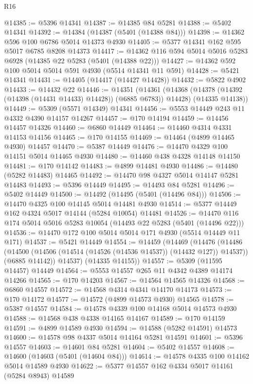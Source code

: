 \begin{lexlean}{R16}
\begin{coremodule}
@14385 := @5396 @14341
@14387 := @14385 @84 @5281
@14388 := @5402 @14341
@14392 := @14384 (@14387 (@5401 (@14388 @84)))
@14398 := @14362 @596 @100 @6786 @5014 @14373 @4930
@14405 := @5377 @14341 @162 @595 @5017 @6785 @8208 @14373
@14417 := @14362 @116 @594 @5014 @5016 @5283 @6928 (@14385 @22 @5283 (@5401 (@14388 @22)))
@14427 := @14362 @592 @100 @5014 @5014 @591 @4930 (@5514 @14341 @11 @591)
@14428 := @5421 @14341
@14431 := @14405 (@14417 (@14427 @14428))
@14432 := @5822 @4902
@14433 := @14432 @22
@14446 := @14351
    (@14361
      (@14368 (@14378 (@14392 (@14398 (@14431 @14433) @14428)) (@6885 @6783)) @14428)
      (@14335 @14138))
@14449 := @5309 (@5571 @14349) @14341
@14456 := @5553 @14449 @243 @11 @4332 @4390 @14157 @14267
@14457 := @170 @14194
@14459 := @14456 @14457 @14326
@14460 := @6860 @14449
@14464 := @14460 @4314 @4331 @14153 @14156
@14465 := @170 @14155
@14469 := @14464 (@4899 @14465 @4930) @14457
@14470 := @5387 @14449
@14476 := @14470 @4329 @100 @14151 @5014 @14465 @4930
@14480 := @14460 @438 @4328 @14148 @14150
@14481 := @170 @14142
@14483 := @4899 @14481 @4930
@14486 := @14480 (@5282 @14483) @14465
@14492 := @14470 @98 @4327 @5014 @14147 @5281 @14483
@14493 := @5396 @14449
@14495 := @14493 @84 @5281
@14496 := @5402 @14449
@14500 := @14492 (@14495 (@5401 (@14496 @84)))
@14506 := @14470 @4325 @100 @14145 @5014 @14481 @4930
@14514 := @5377 @14449 @162 @4324 @5017 @14144 (@5284 @10054) @14481
@14526 := @14470 @116 @174 @5014 @5016 @5283 @10054 (@14493 @22 @5283 (@5401 (@14496 @22)))
@14536 := @14470 @172 @100 @5014 @5014 @171 @4930 (@5514 @14449 @11 @171)
@14537 := @5421 @14449
@14554 := @14459
    (@14469
      (@14476
        (@14486
          (@14500 (@14506 (@14514 (@14526 (@14536 @14537)) (@14432 @127)) @14537))
          (@6885 @14142))
        @14537)
      (@14335 @14155))
@14557 := @5309 (@11595 @14457) @14449
@14564 := @5553 @14557 @265 @11 @4342 @4389 @14174 @14266
@14565 := @170 @14203
@14567 := @14564 @14565 @14326
@14568 := @6860 @14557
@14572 := @14568 @4314 @4341 @14170 @14173
@14573 := @170 @14172
@14577 := @14572 (@4899 @14573 @4930) @14565
@14578 := @5387 @14557
@14584 := @14578 @4339 @100 @14168 @5014 @14573 @4930
@14588 := @14568 @438 @4338 @14165 @14167
@14589 := @170 @14159
@14591 := @4899 @14589 @4930
@14594 := @14588 (@5282 @14591) @14573
@14600 := @14578 @98 @4337 @5014 @14164 @5281 @14591
@14601 := @5396 @14557
@14603 := @14601 @84 @5281
@14604 := @5402 @14557
@14608 := @14600 (@14603 (@5401 (@14604 @84)))
@14614 := @14578 @4335 @100 @14162 @5014 @14589 @4930
@14622 := @5377 @14557 @162 @4334 @5017 @14161 (@5284 @8943) @14589

\end{coremodule}
\end{lexlean}
